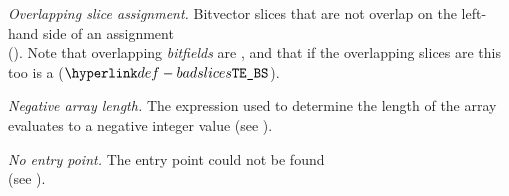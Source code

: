 \begin{description}
\hypertarget{def-overlappingsliceassignment}{}
\item[$\OverlappingSliceAssignment$]
  \textit{Overlapping slice assignment.}
  Bitvector slices that are not \symbolicallyevaluableterm{} overlap on the left-hand side of an assignment \\
  ().
  Note that overlapping \emph{bitfields} are \typingerrorsterm{},
  and that if the overlapping slices are \symbolicallyevaluableterm{} this too is a \typingerrorterm{} ($\BadSlices$).

\hypertarget{def-negativearraylength}{}
\item[$\NegativeArrayLength$]
  \textit{Negative array length.}
  The expression used to determine the length of the array evaluates to a negative integer value
  (see ).

\hypertarget{def-noentrypoint}{}
\item[$\NoEntryPoint$]
  \textit{No entry point.}
  The entry point could not be found\\
  (see ).
\end{description}
